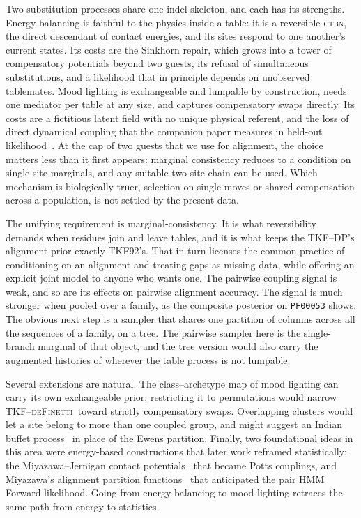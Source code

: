 \documentclass[11pt]{article}
\newcommand{\deF}{\textsc{TKF--deFinetti}}
\newcommand{\CTBN}{\textsc{ctbn}}
\begin{document}
Two substitution processes share one indel skeleton, and each has its
strengths. Energy balancing is faithful to the physics inside a table: it is a
reversible \CTBN, the direct descendant of contact energies, and its sites
respond to one another's current states. Its costs are the Sinkhorn repair,
which grows into a tower of compensatory potentials beyond two guests, its
refusal of simultaneous substitutions, and a likelihood that in principle
depends on unobserved tablemates. Mood lighting is exchangeable and lumpable
by construction, needs one mediator per table at any size, and captures
compensatory swaps directly. Its costs are a fictitious latent field with no
unique physical referent, and the loss of direct dynamical coupling that the
companion paper measures in held-out
likelihood~\citep{LargeHolmes2026Coupled}. At the cap of two guests that we
use for alignment, the choice matters less than it first appears: marginal
consistency reduces to a condition on single-site marginals, and any suitable
two-site chain can be used. Which mechanism is biologically truer, selection
on single moves or shared compensation across a population, is not settled by
the present data.

The unifying requirement is marginal-consistency. It is what reversibility
demands when residues join and leave tables, and it is what keeps the
TKF--DP's alignment prior exactly TKF92's. That in turn licenses the common
practice of conditioning on an alignment and treating gaps as missing data,
while offering an explicit joint model to anyone who wants one. The pairwise
coupling signal is weak, and so are its effects on pairwise alignment
accuracy. The signal is much stronger when pooled over a family, as the
composite posterior on \texttt{PF00053} shows. The obvious next step is a
sampler that shares one partition of columns across all the sequences of a
family, on a tree. The pairwise sampler here is the single-branch marginal of
that object, and the tree version would also carry the augmented histories of
 wherever the table process is not lumpable.

Several extensions are natural. The class--archetype map of mood lighting can
carry its own exchangeable prior; restricting it to permutations would narrow
\deF\ toward strictly compensatory swaps. Overlapping clusters would let a
site belong to more than one coupled group, and might suggest an Indian buffet
process~\citep{ibp} in place of the Ewens partition. Finally, two
foundational ideas in this area were energy-based constructions that later
work reframed statistically: the Miyazawa--Jernigan contact
potentials~\citep{Miyazawa1985} that became Potts couplings, and Miyazawa's
alignment partition functions~\citep{Miyazawa1995} that anticipated the
pair HMM Forward likelihood. Going from energy balancing to mood lighting
retraces the same path from energy to statistics.
\end{document}

